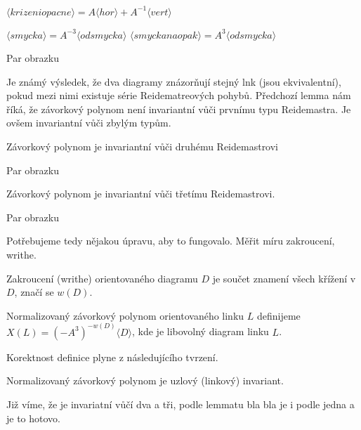 \begin{dusl}
$ \langle krizeni opacne  \rangle = A  \langle hor \rangle + A^{-1}  \langle vert \rangle $
\end{dusl}

\begin{lemma}
$ \langle smycka \rangle = A^{-3} \langle odsmycka \rangle$
$ \langle smycka naopak \rangle = A^{3} \langle odsmycka \rangle$
\end{lemma}
\begin{dukaz}
Par obrazku
\end{dukaz}

Je známý výsledek, že dva diagramy znázorňují stejný lnk (jsou ekvivalentní), pokud mezi nimi existuje série Reidematreových pohybů. Předchozí lemma nám říká, že závorkový polynom není invariantní vůči prvnímu typu Reidemastra. Je ovšem invariantní vůči zbylým typům.

\begin{tvrz}
Závorkový polynom je invariantní vůči druhému Reidemastrovi
\end{tvrz}
\begin{dukaz}
Par obrazku
\end{dukaz}

\begin{dusl}
Závorkový polynom je invariantní vůči třetímu Reidemastrovi.
\end{dusl}
\begin{dukaz}
Par obrazku
\end{dukaz}

Potřebujeme tedy nějakou úpravu, aby to fungovalo. Měřit míru zakroucení, writhe.

\begin{definice}
Zakroucení (writhe) orientovaného diagramu $D$ je součet znamení všech křížení v $D$, značí se $w(D)$.
\end{definice}

\begin{definice}
Normalizovaný závorkový polynom orientovaného linku $L$ definijeme $X(L) = (-A^3)^{-w(D)}\langle D \rangle$, kde je libovolný diagram linku $L$.
\end{definice}

Korektnost definice plyne z následujícího tvrzení.

\begin{tvrz}
Normalizovaný závorkový polynom je uzlový (linkový) invariant.
\end{tvrz}
\begin{dukaz}
Již víme, že je invariatní vůčí dva a tři, podle lemmatu bla bla je i podle jedna a je to hotovo.
\end{dukaz}

